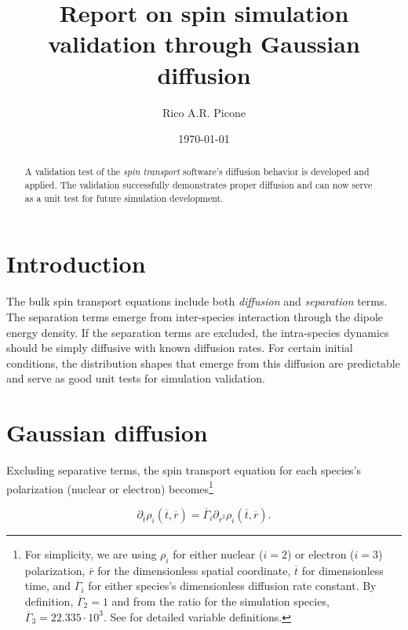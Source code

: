 \documentclass[onecolumn]{amsart}
\author{Rico A.R. Picone}
\date{\today}
\title{Report on spin simulation validation through Gaussian diffusion}
\begin{document}
\maketitle
\begin{abstract}
A validation test of the \emph{spin transport} software's diffusion behavior is developed and applied.
The validation successfully demonstrates proper diffusion and can now serve as a unit test for future simulation development.
\end{abstract}

\section{Introduction}
\label{sec:org54ab8da}
The bulk spin transport equations include both \emph{diffusion} and \emph{separation} terms.
The separation terms emerge from inter-species interaction through the dipole energy density.
If the separation terms are excluded, the intra-species dynamics should be simply diffusive with known diffusion rates.
For certain initial conditions, the distribution shapes that emerge from this diffusion are predictable and serve as good unit tests for simulation validation.

\section{Gaussian diffusion}
\label{sec:org05792ba}
Excluding separative terms, the spin transport equation for each species's polarization (nuclear or electron) becomes\footnote{For simplicity, we are using \(\rho_i\) for either nuclear (\(i=2\)) or electron (\(i=3\)) polarization, \(\overline{r}\) for the dimensionless spatial coordinate, \(\overline{t}\) for dimensionless time, and \(\overline{\Gamma}_i\) for either species's dimensionless diffusion rate constant. By definition, \(\overline{\Gamma}_2 = 1\) and from the ratio for the simulation species, \(\overline{\Gamma}_3 = 22.335 \cdot 10^{3}\). See \cite{Picone2014b,Picone2019} for detailed variable definitions.}

\begin{equation}
\label{eq:diffusion}
\partial_{\overline{t}} \rho_i(\overline{t},\overline{r}) =
\overline{\Gamma}_i \partial_{\overline{r}^2} \rho_i(\overline{t},\overline{r}).
\end{equation}
\end{document}
